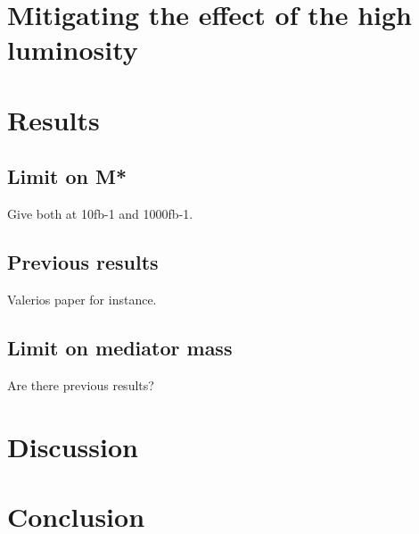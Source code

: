 \section{Mitigating the effect of the high luminosity}
\section{Results}
\subsection{Limit on M*}
Give both at 10fb-1 and 1000fb-1.
\subsection{Previous results}
Valerios paper for instance.
\subsection{Limit on mediator mass}
Are there previous results?
\section{Discussion}
\section{Conclusion}